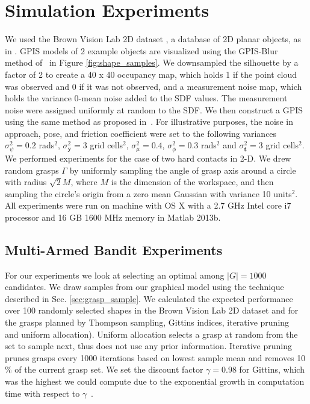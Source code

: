 \documentclass[10pt, conference]{ieeeconf}      %
\newcommand{\bt}{\mathbf{t}}
\newcommand{\by}{\mathbf{y}}
\begin{document}
\section{Simulation Experiments}
We used the Brown Vision Lab 2D dataset \cite{brown}, a database of 2D planar objects, as in \cite{christopoulos2007handling}.
GPIS models of 2 example objects are visualized using the GPIS-Blur method of~\cite{mahler2015gp} in Figure \ref{fig:shape_samples}.
We downsampled the silhouette by a factor of 2 to create a 40 x 40 occupancy map, which holds 1 if the point cloud was observed and 0 if it was not observed, and a measurement noise map, which holds the variance 0-mean noise added to the SDF values.
The measurement noise were assigned uniformly at random to the SDF.
We then construct a GPIS using the same method as proposed in~\cite{mahler2015gp}.
For illustrative purposes, the noise in approach, pose, and friction coefficient were set to the following variances $\sigma_{\psi}^2 = 0.2$ rads$^2$, $\sigma_{\by}^2 = 3$ grid cells$^2$, $\sigma_{\mu}^2 = 0.4$, $\sigma_{\phi}^2 = 0.3$ rads$^2$ and $\sigma_{\bt}^2 = 3$ grid cells$^2$.
We  performed experiments for the case of two hard contacts in 2-D.
We drew random grasps $\Gamma$ by uniformly sampling the angle of grasp axis around a circle with radius $\sqrt{2} M$, where $M$ is the dimension of the workspace, and then sampling the circle's origin from a zero mean Gaussian with variance 10 units$^2$. All experiments were run on machine with OS X with a 2.7 GHz Intel core i7 processor and 16 GB 1600 MHz memory in Matlab 2013b.





\subsection{Multi-Armed Bandit Experiments}
For our experiments we look at selecting an optimal among $|G| = 1000$ candidates. We draw samples from our graphical model using the technique described in Sec.  \ref{sec:grasp_sample}. We calculated the expected performance over 100 randomly selected shapes in the Brown Vision Lab 2D dataset and for the grasps planned by Thompson sampling, Gittins indices, iterative pruning~\cite{kehoe2012toward} and uniform allocation). Uniform allocation selects a grasp at random from the set to sample next, thus does not use any prior information. Iterative pruning prunes grasps every 1000 iterations based on lowest sample mean and removes 10$\%$ of the current grasp set.  We set the discount factor $\gamma =0.98$ for Gittins, which was the highest we could compute due to the exponential growth in computation time with respect to $\gamma$~\cite{gittins2011multi}. 
\end{document}
